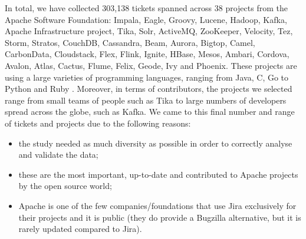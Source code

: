 \documentclass{mpaper}
\begin{document}
In total, we have collected 303,138 tickets spanned across 38 projects from the Apache Software Foundation: Impala, Eagle, Groovy, Lucene,
Hadoop, Kafka, Apache Infrastructure project, Tika, Solr, ActiveMQ, ZooKeeper, Velocity, Tez, Storm, Stratos, CouchDB, Cassandra, 
Beam, Aurora, Bigtop, Camel, CarbonData, Cloudstack, Flex, Flink, Ignite, HBase, Mesos, Ambari, Cordova, Avalon, Atlas, 
Cactus, Flume, Felix, Geode, Ivy and Phoenix. These projects are using a large varieties of programming languages, ranging from Java, C, 
Go to Python and Ruby \cite{apache_projects}. Moreover, in terms of contributors, the projects we selected range from small teams of people
such as Tika to large numbers of developers spread across the globe, such as Kafka. We came to this final number 
and range of tickets and projects due to the following reasons: 
\begin{itemize}
  \item the study needed as much diversity as possible in order to correctly analyse and validate the data;
  \item these are the most important, up-to-date and contributed to Apache projects by the open source world;
  \item Apache is one of the few companies/foundations that use Jira exclusively for their projects and it is public (they do 
  provide a Bugzilla alternative, but it is rarely updated compared to Jira).
\end{itemize}
\end{document}
